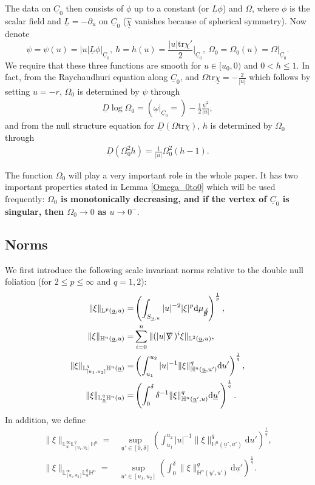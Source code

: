 \documentclass[11pt,reqno]{amsart}
\theoremstyle{definition}
\numberwithin{equation}{section}
\newcommand{\D}{\mathrm{d}}
\newcommand{\tr}{\mathrm{tr}}
\renewcommand{\L}{\mathbb{L}}
\renewcommand{\H}{\mathbb{H}}
\def\chib{\underline{\chi}}
\def\chibh{\widehat{\underline{\chi}}}
\def\Lb{\underline{L}}
\def\tr{\mathrm{tr}}
\def\omegab{\underline{\omega}}
\def\ub{\underline{u}}
\def\Cb{\underline{C}}
\newcommand{\Db}{\underline{D}}
\def\nablas{\mbox{$\nabla \mkern -13mu /$ }}
\def\gs{\mbox{$g \mkern -9mu /$}}
\begin{document}
The data on $\Cb_0$ then consists of $\phi$ up to a constant (or $\Lb\phi$) and $\Omega$, where $\phi$ is the scalar field and $\Lb=-\partial_u$ on $\Cb_0$ ($\chibh$ vanishes because of spherical symmetry).  Now denote
$$\psi=\psi(u)=|u|\Lb\phi\Big|_{\Cb_0},\ h=h(u)=\frac{|u|\tr\chi'}{2}\Big|_{\Cb_0},\ \Omega_0=\Omega_0(u)=\Omega\Big|_{\Cb_0}.$$
We require that these three functions are smooth for $u\in[u_0,0)$  and $0<h\le1$. In fact, from the Raychaudhuri equation along $\Cb_0$, and $\Omega\tr\chib=-\frac{2}{|u|}$ which follows by setting $u=-r$, $\Omega_0$ is determined by $\psi$ through
\begin{align}\label{Omega_0}\Db\log\Omega_0=\left(\omegab\Big|_{\Cb_0}=\right)-\frac{1}{2}\frac{\psi^2}{|u|},\end{align}
and from the null structure equation for $\Db(\Omega\tr\chi)$, $h$ is determined by $\Omega_0$ through
\begin{align}\label{Omega_0^2h}
\Db(\Omega_0^2h)=\frac{1}{|u|}\Omega_0^2(h-1).
\end{align}

The function $\Omega_0$ will play a very important role in the whole paper. It has two important properties stated in Lemma \ref{Omega_0to0} which will be used frequently: {\bf $\Omega_0$ is monotonically decreasing, and if the vertex of $\Cb_0$ is singular, then $\Omega_0\to0$ as $u\to0^-$}. 


\subsection{Norms} We first introduce the following scale invariant norms relative to the double null foliation (for $2\le p\le\infty$ and $q=1,2$):
\begin{align*}
\|\xi\|_{\mathbb{L}^p(\ub,u)}=&\left(\int_{S_{\ub,u}}|u|^{-2}|\xi|^p\D\mu_{\gs}\right)^{\frac{1}{p}},\\
\|\xi\|_{\mathbb{H}^n(\ub,u)}=&\sum_{i=0}^n\|(|u|\nablas)^i\xi\|_{\L^2(\ub,u)},\\
\|\xi\|_{\mathbb{L}^q_{[u_1,u_2]}\mathbb{H}^n(\ub)}=& \left(\int_{u_1}^{u_2}|u|^{-1}\|\xi\|_{\H^n(\ub,u')}^q \D u'\right)^{\frac{1}{q}},\\
\|\xi\|_{\L^q_{\ub}\mathbb{H}^n(u)}=&\left(\int_{0}^{\delta}\delta^{-1}\|\xi\|_{\H^n(\ub',u)}^q\D \ub'\right)^{\frac{1}{q}}.\end{align*}
In addition, we define
\begin{align*}
\|\xi\|_{\L^\infty_{\ub}\L^q_{[u_1,u_2]}\mathbb{H}^n}=&\sup_{\ub'\in[0,\delta]}
\left(\int_{u_1}^{u_2}|u|^{-1}\|\xi\|_{\H^n(\ub',u')}^q\D u'\right)^{\frac{1}{q}},\\
\|\xi\|_{\L^\infty_{[u_1,u_2]}\L^q_{\ub}\mathbb{H}^n}=&\sup_{u'\in[u_1,u_2]}
\left(\int_{0}^{\delta}\|\xi\|_{\H^n(\ub',u')}^q\D \ub'\right)^{\frac{1}{q}}.
\end{align*}
\end{document}
